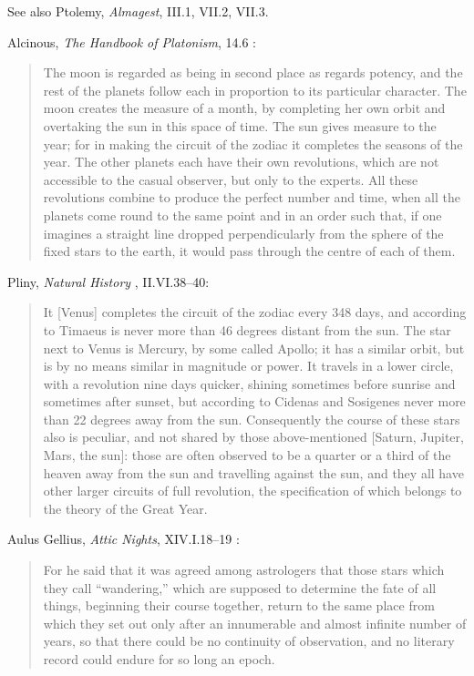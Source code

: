 \documentclass{article}
\begin{document}
See also Ptolemy, {\em Almagest}, III.1, VII.2, VII.3.

Alcinous, {\em The Handbook of Platonism}, 14.6 \cite[pp.~24--25]{alcinous}:

\begin{quote}
The moon is regarded as being in second place as regards potency, and the rest of the planets follow each in proportion to its particular character. The moon creates the measure
of a month, by completing her own orbit and overtaking the sun in this space of time. The sun gives measure to the year; for in making the circuit of the zodiac it completes
the seasons of the year. The other planets each have their own revolutions, which are not accessible to the casual observer, but only to the experts. All these revolutions combine
to produce the perfect number and time, when all the planets come round to the same point and in an order such that, if one imagines a straight line dropped perpendicularly
from the sphere of the fixed stars to the earth, it would pass through the centre of each of them.
\end{quote}


Pliny, {\em Natural History} \cite[p.~193]{pliny}, II.VI.38--40: 

\begin{quote}
It [Venus] completes the circuit of the zodiac every 348 days, and according to Timaeus is never more than 46 degrees
distant from the sun. The star next to Venus is Mercury, by some called Apollo; it has a similar orbit, but is by no means similar in magnitude or
power. It travels in a lower circle, with a revolution nine days quicker, shining sometimes before sunrise and sometimes after sunset, but according to Cidenas
and Sosigenes never more than 22 degrees away from the sun. Consequently the course of these stars also is peculiar, and not shared by those above-mentioned [Saturn, Jupiter,
Mars, the sun]:
those are often observed to be a quarter or a third of the heaven away from the sun and travelling against the sun, and they all have other larger circuits of full revolution,
the specification of which belongs to the theory of the Great Year.
\end{quote}

Aulus Gellius, {\em Attic Nights}, XIV.I.18--19 \cite[pp.~9-11]{gellius}:

\begin{quote}
For he said that it was agreed among astrologers that those stars which they call ``wandering,'' which are supposed to determine the fate of all things,
beginning their course together, return to the same place from which they set out only after an innumerable and almost infinite number of years, so that there could be no continuity
of observation, and no literary record could endure for so long an epoch.
\end{quote}
\end{document}
